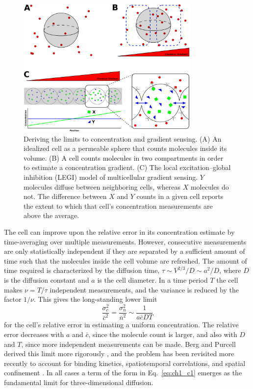 \begin{figure}[ht]
    \centering
        \includegraphics[width=0.8\textwidth]{../fig/ch1_fig2.png}
    \caption{Deriving the limits to concentration and gradient sensing.
    (A) An idealized cell as a permeable sphere that counts molecules inside its volume.
    (B) A cell counts molecules in two compartments in order to estimate a concentration gradient.
    (C) The local excitation--global inhibition (LEGI) model of multicellular gradient sensing. $Y$ molecules diffuse between neighboring cells, whereas $X$ molecules do not. The difference between $X$ and $Y$ counts in a given cell reports the extent to which that cell's concentration measurements are above the average.}
    \label{fig:ch1_2}
\end{figure}

The cell can improve upon the relative error in its concentration estimate by time-averaging over multiple measurements. However, consecutive measurements are only statistically independent if they are separated by a sufficient amount of time such that the molecules inside the cell volume are refreshed. The amount of time required is characterized by the diffusion time, $\tau \sim V^{2/3}/D \sim a^2/D$, where $D$ is the diffusion constant and $a$ is the cell diameter. In a time period $T$ the cell makes $\nu = T/\tau$ independent measurements, and the variance is reduced by the factor $1/\nu$. This gives the long-standing lower limit
\begin{equation} \label{eq:ch1_c1}
\frac{ \sigma_c^2 }{\bar{c}^2} = \frac{ \sigma_n^2}{\bar{n}^2} \sim \frac{1}{a\bar{c}DT}
\end{equation}
for the cell's relative error in estimating a uniform concentration.
The relative error decreases with $a$ and $\bar{c}$, since the molecule count is larger, and also with $D$ and $T$, since more independent measurements can be made. Berg and Purcell derived this limit more rigorously \cite{berg1977physics}, and the problem has been revisited more recently to account for binding kinetics, spatiotemporal correlations, and spatial confinement \cite{bialek2005physical, kaizu2014berg, bicknell2015limits}.
In all cases a term of the form in Eq.\ \ref{eq:ch1_c1} emerges as the fundamental limit for three-dimensional diffusion.

